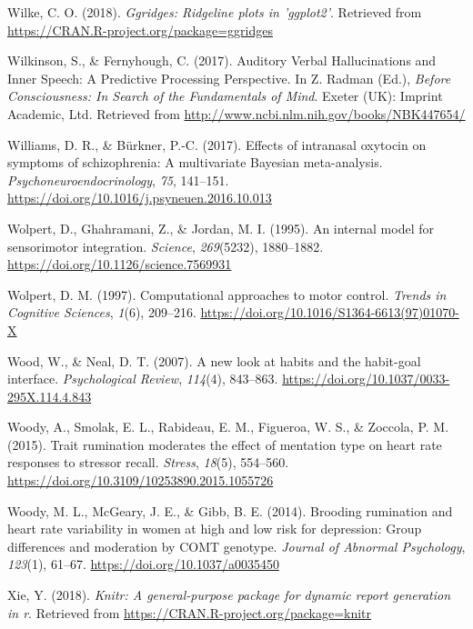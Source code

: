 \documentclass[a4paper,12pt,twoside,onecolumn,openright,final,oldfontcommands]{memoir}
\begin{document}
\leavevmode\hypertarget{ref-R-ggridges}{}%
Wilke, C. O. (2018). \emph{Ggridges: Ridgeline plots in 'ggplot2'}. Retrieved from \url{https://CRAN.R-project.org/package=ggridges}

\leavevmode\hypertarget{ref-wilkinson_auditory_2017}{}%
Wilkinson, S., \& Fernyhough, C. (2017). Auditory Verbal Hallucinations and Inner Speech: A Predictive Processing Perspective. In Z. Radman (Ed.), \emph{Before Consciousness: In Search of the Fundamentals of Mind}. Exeter (UK): Imprint Academic, Ltd. Retrieved from \url{http://www.ncbi.nlm.nih.gov/books/NBK447654/}

\leavevmode\hypertarget{ref-williams_effects_2017}{}%
Williams, D. R., \& Bürkner, P.-C. (2017). Effects of intranasal oxytocin on symptoms of schizophrenia: A multivariate Bayesian meta-analysis. \emph{Psychoneuroendocrinology}, \emph{75}, 141--151. \url{https://doi.org/10.1016/j.psyneuen.2016.10.013}

\leavevmode\hypertarget{ref-wolpert_internal_1995}{}%
Wolpert, D., Ghahramani, Z., \& Jordan, M. I. (1995). An internal model for sensorimotor integration. \emph{Science}, \emph{269}(5232), 1880--1882. \url{https://doi.org/10.1126/science.7569931}

\leavevmode\hypertarget{ref-wolpert_computational_1997}{}%
Wolpert, D. M. (1997). Computational approaches to motor control. \emph{Trends in Cognitive Sciences}, \emph{1}(6), 209--216. \url{https://doi.org/10.1016/S1364-6613(97)01070-X}

\leavevmode\hypertarget{ref-wood_new_2007}{}%
Wood, W., \& Neal, D. T. (2007). A new look at habits and the habit-goal interface. \emph{Psychological Review}, \emph{114}(4), 843--863. \url{https://doi.org/10.1037/0033-295X.114.4.843}

\leavevmode\hypertarget{ref-woody_trait_2015}{}%
Woody, A., Smolak, E. L., Rabideau, E. M., Figueroa, W. S., \& Zoccola, P. M. (2015). Trait rumination moderates the effect of mentation type on heart rate responses to stressor recall. \emph{Stress}, \emph{18}(5), 554--560. \url{https://doi.org/10.3109/10253890.2015.1055726}

\leavevmode\hypertarget{ref-woody_brooding_2014}{}%
Woody, M. L., McGeary, J. E., \& Gibb, B. E. (2014). Brooding rumination and heart rate variability in women at high and low risk for depression: Group differences and moderation by COMT genotype. \emph{Journal of Abnormal Psychology}, \emph{123}(1), 61--67. \url{https://doi.org/10.1037/a0035450}

\leavevmode\hypertarget{ref-R-knitr}{}%
Xie, Y. (2018). \emph{Knitr: A general-purpose package for dynamic report generation in r}. Retrieved from \url{https://CRAN.R-project.org/package=knitr}
\end{document}
